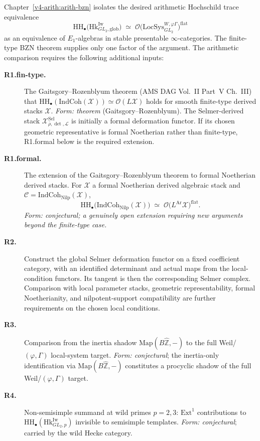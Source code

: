 Chapter~\ref{v4-arith:arith-bzn} isolates the desired arithmetic
Hochschild trace equivalence
\begin{equation}
\label{v4-arith:bzn-sub:eq:F3-statement}
\mathrm{HH}_{\bullet}\bigl(\mathrm{Hk}^{\mathrm{Iw}}_{GL_{2},\mathrm{glob}}\bigr)
\;\simeq\;
\mathcal{O}\bigl(\mathrm{LocSys}^{W,\varphi\Gamma}_{GL_{2}}\bigr)^{\mathrm{flat}}
\end{equation}
as an equivalence of \(E_{1}\)-algebras in stable presentable
\(\infty\)-categories. The finite-type BZN theorem supplies only one
factor of the argument. The arithmetic comparison requires the
following additional inputs:
\begin{description}
\item[\textbf{R1.fin-type.}] The Gaitsgory--Rozenblyum theorem
(AMS DAG Vol.~II Part~V Ch.~III) that
\(\mathrm{HH}_{\bullet}(\mathrm{IndCoh}(\mathcal{X}))\simeq\mathcal{O}(L\mathcal{X})\)
holds for smooth finite-type derived stacks \(\mathcal{X}\).
\emph{Form: theorem} (Gaitsgory--Rozenblyum).
The Selmer-derived stack
\(\mathcal{X}^{\mathrm{Sel}}_{\bar\rho,\det,\mathcal{L}}\)
is initially a formal deformation functor. If its chosen geometric
representative is formal Noetherian rather than finite-type,
R1.formal below is the required extension.
\item[\textbf{R1.formal.}] The extension of the Gaitsgory--Rozenblyum
theorem to formal Noetherian derived stacks. For
\(\mathcal{X}\) a formal Noetherian derived algebraic stack and
\(\mathcal{C}=\mathrm{IndCoh}_{\mathrm{Nilp}}(\mathcal{X})\),
\begin{equation}
\mathrm{HH}_{\bullet}\bigl(\mathrm{IndCoh}_{\mathrm{Nilp}}(\mathcal{X})\bigr)
\;\simeq\;
\mathcal{O}\bigl(L^{\mathrm{Ar}}\mathcal{X}\bigr)^{\mathrm{flat}}.
\end{equation}
\emph{Form: conjectural; a genuinely open extension requiring new arguments beyond the finite-type case.}
\item[\textbf{R2.}] Construct the global Selmer deformation functor
on a fixed coefficient category, with an identified determinant and
actual maps from the local-condition functors. Its tangent is then
the corresponding Selmer complex. Comparison with local parameter
stacks, geometric representability, formal Noetherianity, and
nilpotent-support compatibility are further requirements on the
chosen local conditions.
\item[\textbf{R3.}] Comparison from the inertia shadow
\(\mathrm{Map}(B\widehat{\mathbb{Z}},-)\) to the full
Weil/\((\varphi,\Gamma)\) local-system target.
\emph{Form: conjectural}; the inertia-only identification via
\(\mathrm{Map}(B\widehat{\mathbb{Z}},-)\) constitutes a procyclic shadow of the full
Weil/\((\varphi,\Gamma)\) target.
\item[\textbf{R4.}] Non-semisimple summand at wild primes \(p=2,3\):
\(\mathrm{Ext}^{1}\) contributions to
\(\mathrm{HH}_{\bullet}(\mathrm{Hk}^{\mathrm{Iw}}_{GL_{2},p})\)
invisible to semisimple templates. \emph{Form: conjectural}; carried
by the wild Hecke category.
\end{description}

